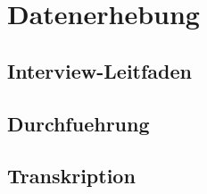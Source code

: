 \chapter{Datenerhebung}\label{chap:erhebung}

\section{Interview-Leitfaden}\label{sec:leitfaden}

\section{Durchfuehrung}\label{sec:durchfuehrung}

\section{Transkription}\label{sec:transkription}
